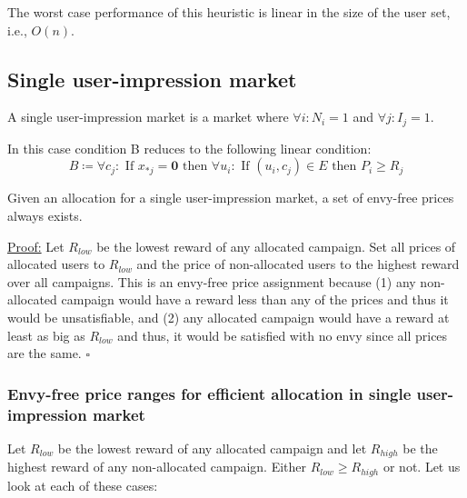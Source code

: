 \documentclass[12pt,letterpaper]{article}
\newcommand{\Campaign}{c}
\newcommand{\CampaignIndex}{j}
\newcommand{\User}{u}
\newcommand{\UserIndex}{i}
\newcommand{\CardinalityUsers}{n}
\newcommand{\Impressions}{I}
\newcommand{\Reward}{R}
\newcommand{\NumberOfUsers}{N}
\newcommand{\Edges}{E}
\newcommand{\Price}{P}
\newcommand{\AllocationMatrixEntry}{x}
\begin{document}
The worst case performance of this heuristic is linear in the size of the user set, i.e., $O(\CardinalityUsers)$.
\newpage
\subsection*{Single user-impression market}

\begin{tcolorbox}[colback=green!5,colframe=green!40!black,title=Definition: single user-impression market]
A single user-impression market is a market where $\forall \UserIndex: \NumberOfUsers_\UserIndex = 1$ and $\forall \CampaignIndex: \Impressions_\CampaignIndex = 1$.
\end{tcolorbox}

In this case condition B reduces to the following linear condition:
$$B \coloneqq \forall \Campaign_{j}: \text{ If }  \AllocationMatrixEntry_{*\CampaignIndex} = \textbf{0} \text{ then }\forall \User_{i}: \text{ If } (\User_\UserIndex,\Campaign_\CampaignIndex)\in\Edges \text{ then } \Price_i \ge \Reward_j $$

\begin{tcolorbox}[colback=green!5,colframe=green!40!black,title=Theorem]
 Given an allocation for a single user-impression market, a set of envy-free prices always exists. 
 \end{tcolorbox}
\underline{Proof:} 
Let $\Reward_{low}$ be the lowest reward of any allocated campaign.
Set all prices of allocated users to $\Reward_{low}$ and the price of non-allocated users to the highest reward over all campaigns. 
This is an envy-free price assignment because (1) any non-allocated campaign would have a reward less than any of the prices and thus it would be unsatisfiable,
and (2) any allocated campaign would have a reward at least as big as $\Reward_{low}$ and thus, it would be satisfied with no envy since all prices are the same. $\square$

\subsubsection*{Envy-free price ranges for efficient allocation in single user-impression market}
Let $\Reward_{low}$ be the lowest reward of any allocated campaign and let $\Reward_{high}$ be the highest reward of any non-allocated campaign.
Either $\Reward_{low} \ge \Reward_{high}$ or not. Let us look at each of these cases:
\end{document}
